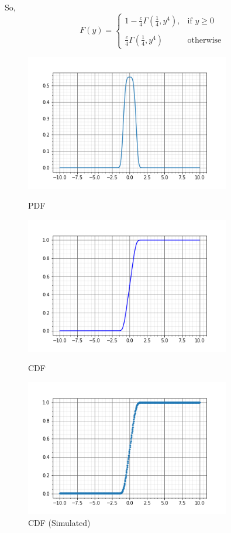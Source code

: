 \documentclass{article}
\theoremstyle{remark}
\begin{document}
So,
\[
    F(y)= 
\begin{cases}
    1 - \frac{c}{4} \Gamma(\frac{1}{4},y^4),& \text{if } y\geq 0\\ \\
    \frac{c}{4} \Gamma(\frac{1}{4},y^4)              & \text{otherwise}
\end{cases}
\]

\begin{figure}
        \centering
        \includegraphics[width=0.8\textwidth]{PDF.png} %
        \caption{PDF}
        \centering
        \includegraphics[width=0.8\textwidth]{CDF.png} %
        \caption{CDF}
        \centering
        \includegraphics[width=0.8\textwidth]{CDF_Simulation.png} %
        \caption{CDF (Simulated)}
\end{figure}
\end{document}
